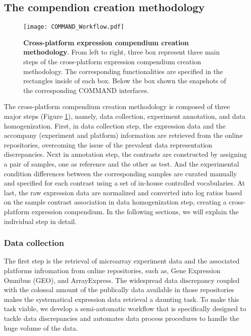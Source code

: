 \subsection{The compendion creation methodology}
\label{sec:colombos-comp-method}

\begin{figure}
  \centering
  \texttt{[image: COMMAND\_Workflow.pdf]}
  \caption[Cross-platform expression compendium creation methodology]{
    \textbf{Cross-platform expression compendium creation methodology}.
    From left to right, three box represent three main steps of the 
    cross-platform expression compendium creation methodology. The 
    corresponding functionalities are specified in the rectangles inside of 
    each box. Below the box shown the snapshots of the corresponding COMMAND 
    interfaces.}
  \label{fig:command-workflow}
\end{figure}


The cross-platform compendium creation methodology is composed of three major 
steps (Figure \ref{fig:command-workflow}), namely, data collection, experiment 
annotation, and data homogenization. 
%
%
First, in data collection step, the expression data and the accompany 
(experiment and platform) information are retrieved from the online 
repositories, overcoming the issue of the prevalent data representation 
discrepancies. 
%
Next in annotation step, the contrasts are constructed by assigning a pair of 
samples, one as reference and the other as test. And the experimental 
condition differences between the corresponding samples are 
curated manually and specified for each contrast using a set of in-house 
controlled vocabularies. 
%
At last, the raw expression data are normalized and converted into log 
ratios based on the sample contrast association in data homogenization step, 
creating a cross-platform expression compendium. 
%
%
In the following sections, we will explain the individual step in detail.









\subsubsection{Data collection}

The first step is the retrieval of microarray experiment data and the
associated platforms infromation from online repositories, such as, Gene
Expression Omnibus (GEO), and ArrayExpress.
%
The widespread data discrepancy coupled with the colossal amount of the
publically data available in those repositories makes the systematical
expression data retrieval a daunting task.
%
To make this task viable, we develop a semi-automatic workflow that is
specifically designed to tackle data discrepancies and automates data
process procedures to handle the huge volume of the data.



